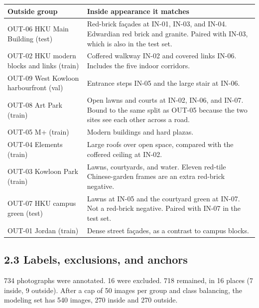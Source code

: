 \documentclass[11pt,a4paper]{article}
\providecommand{\real}[1]{#1}
\newcounter{none}
\begin{document}
{\def\LTcaptype{none} %
\begin{longtable}[]{@{}
  >{\raggedright\arraybackslash}p{(\linewidth - 2\tabcolsep) * \real{0.5000}}
  >{\raggedright\arraybackslash}p{(\linewidth - 2\tabcolsep) * \real{0.5000}}@{}}
\toprule\noalign{}
\begin{minipage}[b]{\linewidth}\raggedright
Outside group
\end{minipage} & \begin{minipage}[b]{\linewidth}\raggedright
Inside appearance it matches
\end{minipage} \\
\midrule\noalign{}
\endhead
\bottomrule\noalign{}
\endlastfoot
OUT-06 HKU Main Building (test) & Red-brick façades at IN-01, IN-03, and IN-04. Edwardian red brick and granite. Paired with IN-03, which is also in the test set. \\
OUT-02 HKU modern blocks and links (train) & Coffered walkway IN-02 and covered links IN-06. Includes the five indoor corridors. \\
OUT-09 West Kowloon harbourfront (val) & Entrance steps IN-05 and the large stair at IN-06. \\
OUT-08 Art Park (train) & Open lawns and courts at IN-02, IN-06, and IN-07. Bound to the same split as OUT-05 because the two sites see each other across a road. \\
OUT-05 M+ (train) & Modern buildings and hard plazas. \\
OUT-04 Elements (train) & Large roofs over open space, compared with the coffered ceiling at IN-02. \\
OUT-03 Kowloon Park (train) & Lawns, courtyards, and water. Eleven red-tile Chinese-garden frames are an extra red-brick negative. \\
OUT-07 HKU campus green (test) & Lawns at IN-05 and the courtyard green at IN-07. Not a red-brick negative. Paired with IN-07 in the test set. \\
OUT-01 Jordan (train) & Dense street façades, as a contrast to campus blocks. \\
\end{longtable}
}

\subsection{2.3 Labels, exclusions, and anchors}\label{labels-exclusions-and-anchors}

734 photographs were annotated. 16 were excluded. 718 remained, in 16 places (7 inside, 9 outside). After a cap of 50 images per group and class balancing, the modeling set has 540 images, 270 inside and 270 outside.
\end{document}
